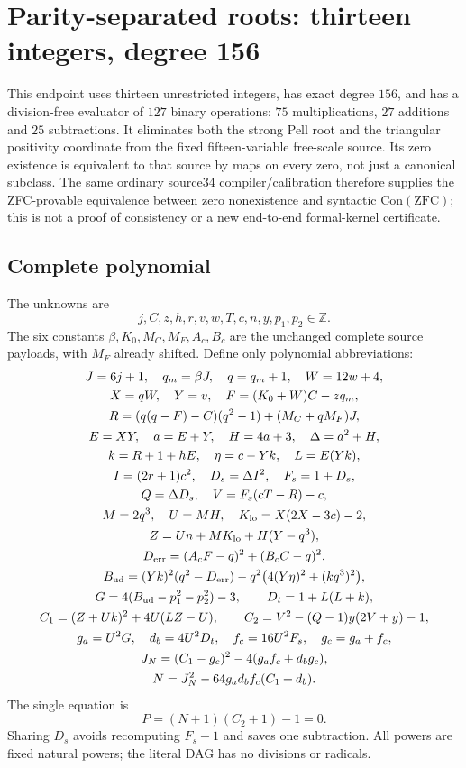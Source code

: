 \section{Parity-separated roots: thirteen integers, degree 156}
\label{sec:parity-three-root13}
This endpoint uses thirteen unrestricted integers, has exact degree $156$, and
has a division-free evaluator of $127$ binary operations: $75$ multiplications,
$27$ additions and $25$ subtractions. It eliminates both the strong Pell root and
the triangular positivity coordinate from the fixed fifteen-variable free-scale
source. Its zero existence is equivalent to that source by maps on every zero,
not just a canonical subclass. The same ordinary source34 compiler/calibration
therefore supplies the ZFC-provable equivalence between zero nonexistence and
syntactic $\mathrm{Con}(\mathrm{ZFC})$; this is not a proof of consistency or a new
end-to-end formal-kernel certificate.

\subsection{Complete polynomial}
The unknowns are
\[
 j,C,z,h,r,v,w,T,c,n,y,p_1,p_2\in\mathbb Z.
\]
The six constants $\beta,K_0,M_C,M_F,A_c,B_c$ are the unchanged complete source
payloads, with $M_F$ already shifted. Define only polynomial abbreviations:
\begin{gather*}
 J=6j+1,\quad q_m=\beta J,\quad q=q_m+1,\quad W=12w+4,\\
 X=qW,\quad Y=v,\quad F=(K_0+W)C-zq_m,\\
 R=(q(q-F)-C)(q^2-1)+(M_C+qM_F)J,\\
 E=XY,\quad a=E+Y,\quad H=4a+3,\quad\Delta=a^2+H,\\
 k=R+1+hE,\quad \eta=c-Yk,\quad L=E(Yk),\\
 I=(2r+1)c^2,\quad D_s=\Delta I^2,\quad F_s=1+D_s,\\
 Q=\Delta D_s,\quad V=F_s(cT-R)-c,\\
 M=2q^3,\quad U=MH,\quad K_{\rm lo}=X(2X-3c)-2,\\
 Z=Un+MK_{\rm lo}+H(Y-q^3),\\
 D_{\rm err}=(A_cF-q)^2+(B_cC-q)^2,\\
 B_{\rm ud}=(Yk)^2(q^2-D_{\rm err})
       -q^2\bigl(4(Y\eta)^2+(kq^3)^2\bigr),\\
 G=4(B_{\rm ud}-p_1^2-p_2^2)-3,\qquad D_t=1+L(L+k),\\
 C_1=(Z+Uk)^2+4U(LZ-U),\qquad
 C_2=V^2-(Q-1)y(2V+y)-1,\\
 g_a=U^2G,\quad d_b=4U^2D_t,\quad f_c=16U^2F_s,\quad g_c=g_a+f_c,\\
 J_N=(C_1-g_c)^2-4(g_af_c+d_bg_c),\\
 N=J_N^2-64g_ad_bf_c(C_1+d_b).
\end{gather*}
The single equation is
\[
 \boxed{P=(N+1)(C_2+1)-1=0.}
\]
Sharing $D_s$ avoids recomputing $F_s-1$ and saves one subtraction. All powers
are fixed natural powers; the literal DAG has no divisions or radicals.

